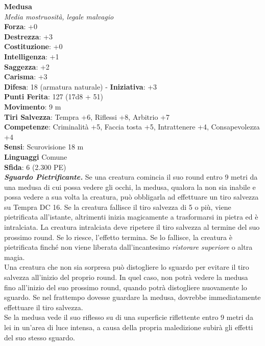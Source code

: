 \begin{multicols}{2}
\medskip\textbf{Medusa}\\
\emph{Media mostruosità, legale malvagio}\\
\textbf{Forza}: +0\\
\textbf{Destrezza}: +3\\
\textbf{Costituzione}: +0\\
\textbf{Intelligenza}: +1\\
\textbf{Saggezza}: +2\\
\textbf{Carisma}: +3\\
\textbf{Difesa}: 18 (armatura naturale) - \textbf{Iniziativa}: +3\\
\textbf{Punti Ferita}: 127 (17d8 + 51)\\
\textbf{Movimento}: 9 m\\
\textbf{Tiri Salvezza}: Tempra +6, Riflessi +8, Arbitrio +7\\
\textbf{Competenze}: Criminalità +5, Faccia tosta +5, Intrattenere +4, Consapevolezza +4\\
\textbf{Sensi}: Scurovisione 18 m\\
\textbf{Linguaggi} Comune\\
\textbf{Sfida}: 6 (2.300 PE)\smallskip\\
\emph{\textbf{Sguardo Pietrificante.}} Se una creatura comincia il suo round entro 9 metri da una medusa di cui possa vedere gli occhi, la medusa, qualora la non sia inabile e possa vedere a sua volta la creatura, può obbligarla ad effettuare un tiro salvezza su Tempra DC  16. Se la creatura fallisce il tiro salvezza di 5 o più, viene pietrificata all'istante, altrimenti inizia magicamente a trasformarsi in pietra ed è intralciata. La creatura intralciata deve ripetere il tiro salvezza al termine del suo prossimo round. Se lo riesce, l'effetto termina. Se lo fallisce, la creatura è pietrificata finché non viene liberata dall'incantesimo \emph{ristorare superiore} o altra magia.\\
Una creatura che non sia sorpresa può distogliere lo sguardo per evitare il tiro salvezza all'inizio del proprio round. In quel caso, non potrà vedere la medusa fino all'inizio del suo prossimo round, quando potrà distogliere nuovamente lo sguardo. Se nel frattempo dovesse guardare la medusa, dovrebbe immediatamente effettuare il tiro salvezza.\\
Se la medusa vede il suo riflesso su di una superficie riflettente entro 9 metri da lei in un'area di luce intensa, a causa della propria maledizione subirà gli effetti del suo stesso sguardo.\\


\end{multicols}
